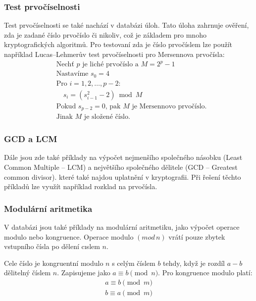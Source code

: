 \documentclass[titlepage]{article}
\begin{document}
\subsubsection{Test prvočíselnosti}
Test prvočíselnosti se také nachází v databázi úloh. Tato úloha zahrnuje ověření, zda je zadané číslo prvočíslo či nikoliv, což je základem pro mnoho kryptografických algoritmů. Pro testovaní zda je číslo prvočíslem lze použít například Lucas–Lehmerův test prvočíselnosti pro Mersennova prvočísla:
\begin{align*}
    &\text{Nechť } p \text{ je liché prvočíslo a } M = 2^p-1 \\
    &\text{Nastavíme } s_0 = 4 \\
    &\text{Pro } i=1,2,\dots,p-2: \\
    &\quad s_i = (s_{i-1}^2-2) \bmod M \\
    &\text{Pokud } s_{p-2} = 0 \text{, pak } M \text{ je Mersennovo prvočíslo.} \\
    &\text{Jinak } M \text{ je složené číslo.}
\end{align*}

\subsubsection{GCD a LCM}
Dále jsou zde také příklady na výpočet nejmenšího společného ná\-so\-bku (Le\-ast Com\-mon Multiple -- LCM) 
a největšího společného dělitele (GCD -- Greatest common divisor). 
které také najdou uplatnění v kryptografii. Při řešení těchto příkladů lze využít například rozklad na prvočísla.
\newline

\subsubsection{Modulární aritmetika}
V databázi jsou také příklady na modulární aritmetiku, jako výpočet operace modulo nebo kongruence. 
Operace modulo $(mod\,n)$ vrátí pouze zbytek vstupního čísla po
dělení cıslem $n$.


Cele číslo je kongruentní modulo $n$ s celým číslem $b$ tehdy, když
je rozdíl $a - b$ dělitelný číslem $n$. Zapisujeme jako $a \equiv b \pmod n$.
Pro kongruence modulo platí:
\begin{align*}
    a \equiv b \pmod{m} \\
    b \equiv a \pmod{m} \\
\end{align*}
\end{document}
